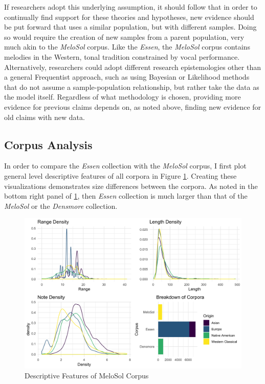 \documentclass[12pt,]{book}
\begin{document}
If researchers adopt this underlying assumption, it should follow that in order to continually find support for these theories and hypotheses, new evidence should be put forward that uses a similar population, but with different samples.
Doing so would require the creation of new samples from a parent population, very much akin to the \emph{MeloSol} corpus.
Like the \emph{Essen}, the \emph{MeloSol} corpus contains melodies in the Western, tonal tradition constrained by vocal performance.
Alternatively, researchers could adopt different research epistemologies other than a general Frequentist approach, such as using Bayesian or Likelihood methods that do not assume a sample-population relationship, but rather take the data as the model itself.
Regardless of what methodology is chosen, providing more evidence for previous claims depends on, as noted above, finding new evidence for old claims with new data.

\hypertarget{corpus-analysis-1}{%
\subsection{Corpus Analysis}\label{corpus-analysis-1}}

In order to compare the \emph{Essen} collection with the \emph{MeloSol} corpus, I first plot general level descriptive features of all corpora in Figure \ref{fig:compdesc}.
Creating these visualizations demonstrates size differences between the corpora.
As noted in the bottom right panel of \ref{fig:compdesc}, then \emph{Essen} collection is much larger than that of the \emph{MeloSol} or the \emph{Densmore} collection.

\begin{figure}

{\centering \includegraphics[width=1\linewidth]{img/comparative_descritivepanel} 

}

\caption{Descriptive Features of MeloSol Corpus}\label{fig:compdesc}
\end{figure}
\end{document}
